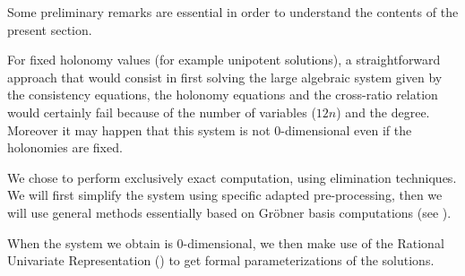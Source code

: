 Some preliminary remarks are essential in order to understand the contents of the present section.

For fixed holonomy values (for example unipotent solutions), a
straightforward approach that would consist in first solving the large
algebraic system given by the consistency equations, the holonomy
equations and the cross-ratio relation would certainly fail because of
the number of variables ($12 n$) and the degree. Moreover it may
happen that this system is not 0-dimensional even if the holonomies
are fixed.



We chose to perform exclusively exact computation, using elimination techniques.
We will first simplify the system using specific adapted pre-processing, then we will use general methods essentially based on Gröbner basis computations (see \cite{CLO1997}).


When the system we obtain is 0-dimensional, we then make use of
the Rational Univariate Representation (\cite{Rouillier1999}) to get
formal parameterizations of the solutions.


